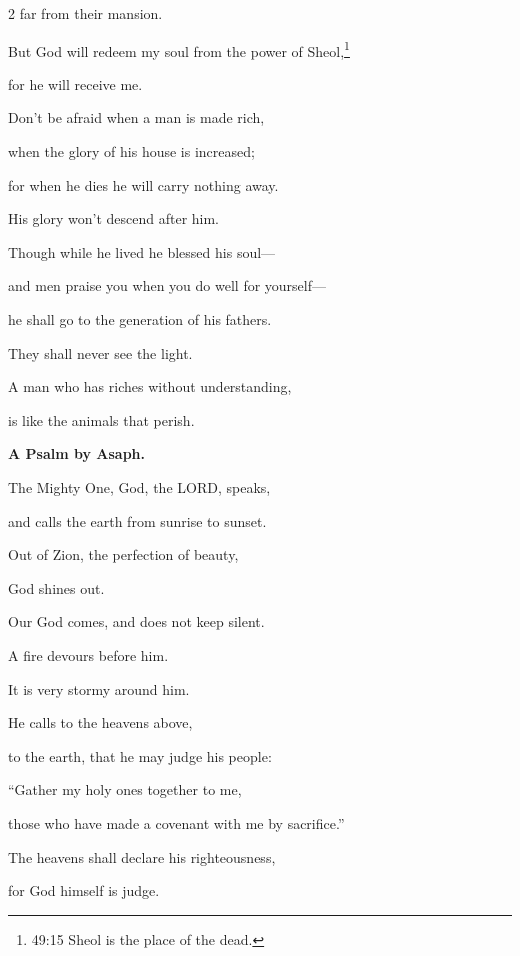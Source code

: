 \begin{multicols}{2}
	far from their mansion.
	
	
	\myverse{}But God will redeem my soul from the power of Sheol,\footnote{49:15 Sheol is the place of the dead.}
	
	for he will receive me.
	
	\vspace{\baselineskip}
	
	
	\myverse{}Don’t be afraid when a man is made rich,
	
	when the glory of his house is increased;
	
	
	\myverse{}for when he dies he will carry nothing away.
	
	His glory won’t descend after him.	
	
	\myverse{}Though while he lived he blessed his soul---
	
	and men praise you when you do well for yourself---
	
	
	\myverse{}he shall go to the generation of his fathers.
	
	They shall never see the light.
	
	
	\myverse{}A man who has riches without understanding,
	
	is like the animals that perish.
	
	
	\mychapter{}\textbf{A Psalm by Asaph.}
	
	\quad \myverse*{}The Mighty One, God, the LORD, speaks,
	
	and calls the earth from sunrise to sunset.
	
	
	\myverse{}Out of Zion, the perfection of beauty,
	
	God shines out.
	
	
	\myverse{}Our God comes, and does not keep silent.
	
	A fire devours before him.
	
	It is very stormy around him.
	
	
	\myverse{}He calls to the heavens above,
	
	to the earth, that he may judge his people:
	
	
	\myverse{}“Gather my holy ones together to me,
	
	those who have made a covenant with me by sacrifice.”
	
	
	\myverse{}The heavens shall declare his righteousness,
	
	for God himself is judge.
	
	\vspace{\baselineskip}	
	

\end{multicols}
